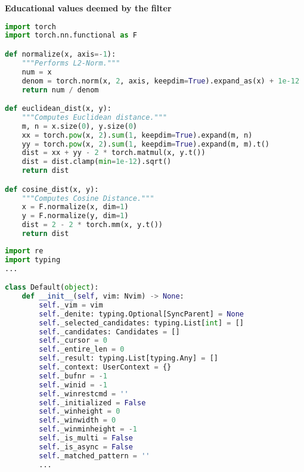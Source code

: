 \begin{AIbox}{\bf{\large Educational values deemed by the filter}}
\vspace{0.2cm}
\begin{minipage}[t]{0.48\linewidth}
\centering

\begin{lstlisting}[language=Python, style=mystyle]
import torch
import torch.nn.functional as F

def normalize(x, axis=-1):
    """Performs L2-Norm."""
    num = x
    denom = torch.norm(x, 2, axis, keepdim=True).expand_as(x) + 1e-12
    return num / denom

def euclidean_dist(x, y):
    """Computes Euclidean distance."""
    m, n = x.size(0), y.size(0)
    xx = torch.pow(x, 2).sum(1, keepdim=True).expand(m, n)
    yy = torch.pow(x, 2).sum(1, keepdim=True).expand(m, m).t()
    dist = xx + yy - 2 * torch.matmul(x, y.t())
    dist = dist.clamp(min=1e-12).sqrt()
    return dist

def cosine_dist(x, y):
    """Computes Cosine Distance."""
    x = F.normalize(x, dim=1)
    y = F.normalize(y, dim=1)
    dist = 2 - 2 * torch.mm(x, y.t())
    return dist
\end{lstlisting}  
\end{minipage}\hfill
\begin{minipage}[t]{0.5\linewidth}
\centering
{} 

\begin{lstlisting}[language=Python, style=mystyle]
import re
import typing
...

class Default(object):
    def __init__(self, vim: Nvim) -> None:
        self._vim = vim
        self._denite: typing.Optional[SyncParent] = None
        self._selected_candidates: typing.List[int] = []
        self._candidates: Candidates = []
        self._cursor = 0
        self._entire_len = 0
        self._result: typing.List[typing.Any] = []
        self._context: UserContext = {}
        self._bufnr = -1
        self._winid = -1
        self._winrestcmd = ''
        self._initialized = False
        self._winheight = 0
        self._winwidth = 0
        self._winminheight = -1
        self._is_multi = False
        self._is_async = False
        self._matched_pattern = ''
        ...
\end{lstlisting}  
\end{minipage}
\end{AIbox}
